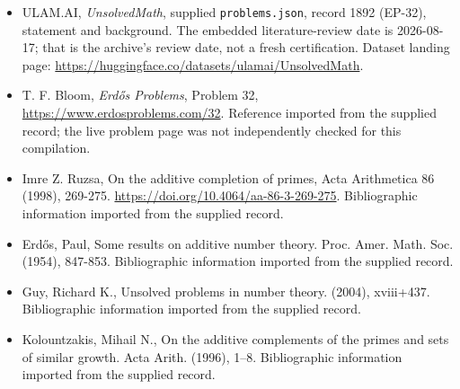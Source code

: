 \documentclass[11pt,a4paper]{article}
\begin{document}
{\small

\begin{itemize}

\item[\hypertarget{source:1892:1}{S1}] ULAM.AI, \emph{UnsolvedMath}, supplied \texttt{problems.json}, record 1892 (EP-32), statement and background. The embedded literature-review date is 2026-08-17; that is the archive’s review date, not a fresh certification. Dataset landing page: \url{https://huggingface.co/datasets/ulamai/UnsolvedMath}.

\item[\hypertarget{source:1892:2}{S2}] T. F. Bloom, \emph{Erdős Problems}, Problem 32, \url{https://www.erdosproblems.com/32}. Reference imported from the supplied record; the live problem page was not independently checked for this compilation.

\item[\hypertarget{source:1892:3}{S3}] Imre Z. Ruzsa, On the additive completion of primes, Acta Arithmetica 86 (1998), 269-275. \url{https://doi.org/10.4064/aa-86-3-269-275}. Bibliographic information imported from the supplied record.

\item[\hypertarget{source:1892:4}{S4}] Erd\H{o}s, Paul, Some results on additive number theory. Proc. Amer. Math. Soc. (1954), 847-853. Bibliographic information imported from the supplied record.

\item[\hypertarget{source:1892:5}{S5}] Guy, Richard K., Unsolved problems in number theory. (2004), xviii+437. Bibliographic information imported from the supplied record.

\item[\hypertarget{source:1892:6}{S6}] Kolountzakis, Mihail N., On the additive complements of the primes and sets of similar growth. Acta Arith. (1996), 1--8. Bibliographic information imported from the supplied record.

\end{itemize}

}

\label{end:1892}
\end{document}
